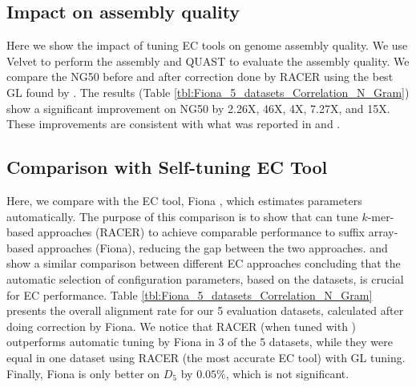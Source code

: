 \vspace{-12pt}
\subsection{Impact on assembly quality}
\vspace{-5pt}

Here we show the impact of tuning EC tools on genome assembly quality. We use Velvet \cite{zerbino2008velvet} to perform the assembly and QUAST \cite{gurevich2013quast} to evaluate the assembly quality. We compare the NG50 before and after correction done by RACER using the best GL found by \name. The results (Table \ref{tbl:Fiona_5_datasets_Correlation_N_Gram}) show a significant improvement on NG50 by 2.26X, 46X, 4X, 7.27X, and 15X. These improvements are consistent with what was reported in \cite{heydari2017evaluation} and \cite{greenfield2014blue}.
\vspace{-12pt}
\subsection{Comparison with Self-tuning EC Tool}
\vspace{-5pt}
Here, we compare \name with the EC tool, Fiona \cite{schulz2014fiona}, which estimates parameters automatically. The purpose of this comparison is to show that \name can tune $k$-mer-based approaches (\eg RACER) to achieve comparable performance to suffix array-based approaches (\eg Fiona), reducing the gap between the two approaches. \cite{yang2012survey} and \cite{molnar2014correcting} show a similar comparison between different EC approaches concluding that the automatic selection of configuration parameters, based on the datasets, is crucial for EC performance.
 Table \ref{tbl:Fiona_5_datasets_Correlation_N_Gram} presents the overall alignment rate for our 5 evaluation datasets, calculated after doing correction by Fiona. We notice that RACER (when tuned with \name) outperforms automatic tuning by Fiona in 3 of the 5 datasets, while they were equal in one dataset using RACER (the most accurate EC tool) with GL tuning. Finally, Fiona is only better on $D_{5} $ by $0.05\%$, which is not significant.  






